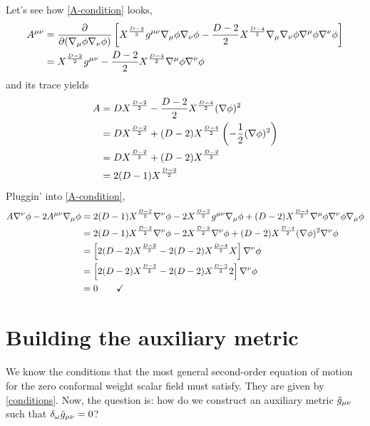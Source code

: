 \begin{ej}
Let's see how \eqref{A-condition} looks,
\begin{align}
  A^{\mu\nu }&=\pdv{(\nabla_\mu\phi\nabla_\nu\phi)}\left[X^{\frac{D-2}{2}}g^{\mu\nu }\nabla_\mu\phi \nabla_\nu\phi  -\frac{D-2}{2}X^{\frac{D-4}{2}}\nabla_\mu \nabla_\nu \phi\nabla^\mu \phi\nabla^\nu \phi \right]\\
  &=X^{\frac{D-2}{2}}g^{\mu\nu }-\frac{D-2}{2}X^{\frac{D-4}{2}}\nabla^\mu \phi \nabla^\nu\phi 
\end{align}
and its trace yields
\begin{align}
  A&=DX^{\frac{D-2}{2}}-\frac{D-2}{2}X^{\frac{D-4}{2}}(\nabla\phi )^2\\
  &=DX^{\frac{D-2}{2}}+(D-2)X^{\frac{D-4}{2}}\left(-\frac{1}{2}(\nabla\phi )^2\right)\\
  &=DX^{\frac{D-2}{2}}+(D-2)X^{\frac{D-2}{2}}\\
  &=2(D-1)X^{\frac{D-2}{2}}
\end{align}
Pluggin' into \eqref{A-condition},
\begin{align*}
  A\nabla^\nu \phi-2A^{\mu\nu }\nabla_\mu \phi&=2(D-1)X^{\frac{D-2}{2}}\nabla^\nu\phi -2X^{\frac{D-2}{2}}g^{\mu\nu }\nabla_\mu \phi +(D-2)X^{\frac{D-4}{2}}\nabla^\mu\phi \nabla^\nu\phi \nabla_\mu\phi \\
  &=2(D-1)X^{\frac{D-2}{2}}\nabla^\nu\phi-2X^{\frac{D-2}{2}}\nabla^\nu\phi +(D-2)X^{\frac{D-4}{2}}(\nabla\phi )^2\nabla^\nu\phi \\
  &=\left[2(D-2)X^{\frac{D-2}{2}}-2(D-2)X^{\frac{D-4}{2}}X\right]\nabla^\nu\phi \\
  &=\left[2(D-2)X^{\frac{D-2}{2}}-2(D-2)X^{\frac{D-2}{2}}2\right]\nabla^\nu\phi \\
  &=0\qquad \checkmark
\end{align*}
\end{ej}



\section{Building the auxiliary metric}
We know the conditions that the most general second-order equation of motion for the zero conformal weight scalar field must satisfy. They are given by \eqref{conditions}. Now, the question is: how do we construct an auxiliary metric $\tilde{g}_{\mu\nu }$ such that  $\delta_\omega \tilde{g}_{\mu\nu }=0$?

